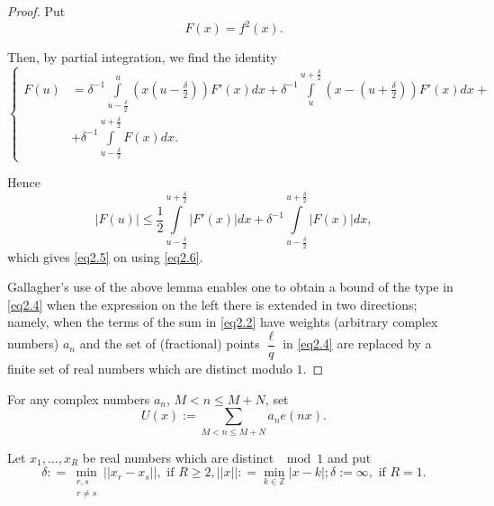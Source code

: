 \begin{proof} %
Put
\begin{equation*}
F(x)=f^2(x). \tag{2.6}\label{eq2.6}
\end{equation*}

Then, by partial integration, we find the identity 
\begin{equation*}
\begin{cases}
F(u) &= \delta^{-1} \int\limits_{u- \frac{\delta}{2}}^{u} (x(u- \frac{\delta}{2})) F' (x) dx+ \delta^{-1} \int\limits_{u}^{u + \frac{\delta}{2}}(x-(u+ \frac{\delta}{2})) F' (x) dx +\\
& + \delta^{-1} \int\limits^{u+ \frac{\delta}{2}}_{u- \frac{\delta}{2}} F (x) dx.
\end{cases}\tag{2.7}\label{eq2.7}
\end{equation*}\pageoriginale

Hence 
\begin{equation*}
|F (u)| \leq \frac{1}{2} \int\limits^{u + \frac{\delta}{2}}_{u-
  \frac{\delta}{2}}|F'(x)| dx + \delta^{-1} \int\limits^{u+
  \frac{\delta}{2}}_{u- \frac{\delta}{2}} |F(x)| dx, \tag{2.8}\label{eq2.8} 
\end{equation*}
which gives \eqref{eq2.5} on using \eqref{eq2.6}.

Gallagher's use of the above lemma enables one to obtain a bound of
the type in \eqref{eq2.4} when the expression on the left there is extended
in two directions; namely, when the terms of the sum in \eqref{eq2.2} have
weights (arbitrary complex numbers) $a_n$ and the set of (fractional)
points $\dfrac{\ell}{q}$ in \eqref{eq2.4} are replaced by a finite set of
real numbers which are distinct modulo $1$. 
\end{proof}

\setcounter{section}{2}
\begin{theorem}\label{chap2-thm2.1} %
For any complex numbers $a_n$, $M < n\leq M + N$, set 
\begin{equation*}
U(x):= \sum_{M < n \leq M + N} a_n e(nx). \tag{2.9}\label{eq2.9}
\end{equation*}
\end{theorem}

Let $x_1, \ldots , x_R$ be real numbers which are distinct $\mod 1$ and put 
\begin{equation*}
\delta : = \min_{\substack{r,s\\ r \neq s}} || x_r -x_s || , \text{ if
  } R \geq 2, || x || : = \min_{k \in \mathbb{Z}} |x-k|; \delta := \infty
, \text{ if }  R= 1. \tag{2.10}\label{eq2.10} 
\end{equation*}

